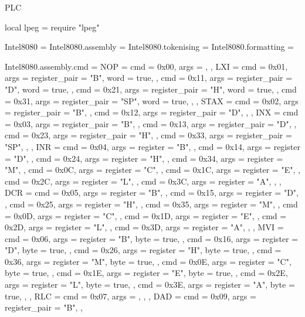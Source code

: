 \startenvironment PLC

\startluacode

local lpeg = require "lpeg"

Intel8080 = {}
Intel8080.assembly = {}
Intel8080.tokenising = {}
Intel8080.formatting = {}

Intel8080.assembly.cmd = {
    NOP  = {
        {cmd = 0x00, args = {}},
    },
    LXI  = {
        { cmd = 0x01, args = {{register_pair = "B"},  {word = true}}, },
        { cmd = 0x11, args = {{register_pair = "D"},  {word = true}}, },
        { cmd = 0x21, args = {{register_pair = "H"},  {word = true}}, },
        { cmd = 0x31, args = {{register_pair = "SP"}, {word = true}}, },
    },
    STAX = {
        { cmd = 0x02, args = {{register_pair = "B"}}, },
        { cmd = 0x12, args = {{register_pair = "D"}}, },
    },
    INX  = {
        { cmd = 0x03, args = {{register_pair = "B"}}, },
        { cmd = 0x13, args = {{register_pair = "D"}}, },
        { cmd = 0x23, args = {{register_pair = "H"}}, },
        { cmd = 0x33, args = {{register_pair = "SP"}}, },
    },
    INR  = {
        { cmd = 0x04, args = {{register = "B"}}, },
        { cmd = 0x14, args = {{register = "D"}}, },
        { cmd = 0x24, args = {{register = "H"}}, },
        { cmd = 0x34, args = {{register = "M"}}, },
        { cmd = 0x0C, args = {{register = "C"}}, },
        { cmd = 0x1C, args = {{register = "E"}}, },
        { cmd = 0x2C, args = {{register = "L"}}, },
        { cmd = 0x3C, args = {{register = "A"}}, },
    },
    DCR  = {
        { cmd = 0x05, args = {{register = "B"}}, },
        { cmd = 0x15, args = {{register = "D"}}, },
        { cmd = 0x25, args = {{register = "H"}}, },
        { cmd = 0x35, args = {{register = "M"}}, },
        { cmd = 0x0D, args = {{register = "C"}}, },
        { cmd = 0x1D, args = {{register = "E"}}, },
        { cmd = 0x2D, args = {{register = "L"}}, },
        { cmd = 0x3D, args = {{register = "A"}}, },
    },
    MVI  = {
        { cmd = 0x06, args = {{register = "B"}, {byte = true}}, },
        { cmd = 0x16, args = {{register = "D"}, {byte = true}}, },
        { cmd = 0x26, args = {{register = "H"}, {byte = true}}, },
        { cmd = 0x36, args = {{register = "M"}, {byte = true}}, },
        { cmd = 0x0E, args = {{register = "C"}, {byte = true}}, },
        { cmd = 0x1E, args = {{register = "E"}, {byte = true}}, },
        { cmd = 0x2E, args = {{register = "L"}, {byte = true}}, },
        { cmd = 0x3E, args = {{register = "A"}, {byte = true}}, },
    },
    RLC  = {
        { cmd = 0x07, args = {}, },
    },
    DAD  = {
        { cmd = 0x09, args = {{register_pair = "B"}}, },
}}
